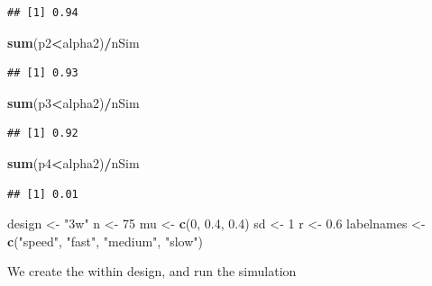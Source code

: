 \documentclass[]{book}
\newenvironment{Shaded}{\begin{snugshade}}{\end{snugshade}}
\newcommand{\DecValTok}[1]{\textcolor[rgb]{0.00,0.00,0.81}{#1}}
\newcommand{\FloatTok}[1]{\textcolor[rgb]{0.00,0.00,0.81}{#1}}
\newcommand{\KeywordTok}[1]{\textcolor[rgb]{0.13,0.29,0.53}{\textbf{#1}}}
\newcommand{\NormalTok}[1]{#1}
\newcommand{\OperatorTok}[1]{\textcolor[rgb]{0.81,0.36,0.00}{\textbf{#1}}}
\newcommand{\StringTok}[1]{\textcolor[rgb]{0.31,0.60,0.02}{#1}}
\begin{document}
\begin{verbatim}
## [1] 0.94
\end{verbatim}

\begin{Shaded}
\begin{Highlighting}[]
\KeywordTok{sum}\NormalTok{(p2}\OperatorTok{<}\NormalTok{alpha2)}\OperatorTok{/}\NormalTok{nSim}
\end{Highlighting}
\end{Shaded}

\begin{verbatim}
## [1] 0.93
\end{verbatim}

\begin{Shaded}
\begin{Highlighting}[]
\KeywordTok{sum}\NormalTok{(p3}\OperatorTok{<}\NormalTok{alpha2)}\OperatorTok{/}\NormalTok{nSim}
\end{Highlighting}
\end{Shaded}

\begin{verbatim}
## [1] 0.92
\end{verbatim}

\begin{Shaded}
\begin{Highlighting}[]
\KeywordTok{sum}\NormalTok{(p4}\OperatorTok{<}\NormalTok{alpha2)}\OperatorTok{/}\NormalTok{nSim}
\end{Highlighting}
\end{Shaded}

\begin{verbatim}
## [1] 0.01
\end{verbatim}

\begin{Shaded}
\begin{Highlighting}[]
\NormalTok{design <-}\StringTok{ "3w"}
\NormalTok{n <-}\StringTok{ }\DecValTok{75}
\NormalTok{mu <-}\StringTok{ }\KeywordTok{c}\NormalTok{(}\DecValTok{0}\NormalTok{, }\FloatTok{0.4}\NormalTok{, }\FloatTok{0.4}\NormalTok{)}
\NormalTok{sd <-}\StringTok{ }\DecValTok{1}
\NormalTok{r <-}\StringTok{ }\FloatTok{0.6}
\NormalTok{labelnames <-}\StringTok{ }\KeywordTok{c}\NormalTok{(}\StringTok{"speed"}\NormalTok{, }\StringTok{"fast"}\NormalTok{, }\StringTok{"medium"}\NormalTok{, }\StringTok{"slow"}\NormalTok{)}
\end{Highlighting}
\end{Shaded}

We create the within design, and run the simulation
\end{document}
